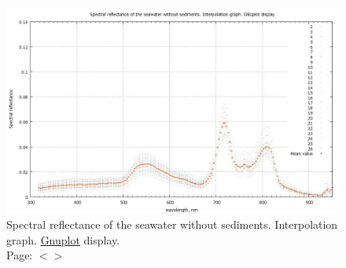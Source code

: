 \documentclass[11pt]{article}
\begin{document}
\begin{appendices}
\begin{figure}[H]
	\begin{center}
		\includegraphics[scale=0.22]{GNU-10.jpg}
		\caption{Spectral reflectance of the seawater without sediments. Interpolation graph. \href{http://www.gnuplot.info/}{Gnuplot} display. \\
Page: $<$\pageref{page-31}$>$­}
		\label{fig:A.24}
	\end{center}
\end{figure}


\end{appendices}
\end{document}
